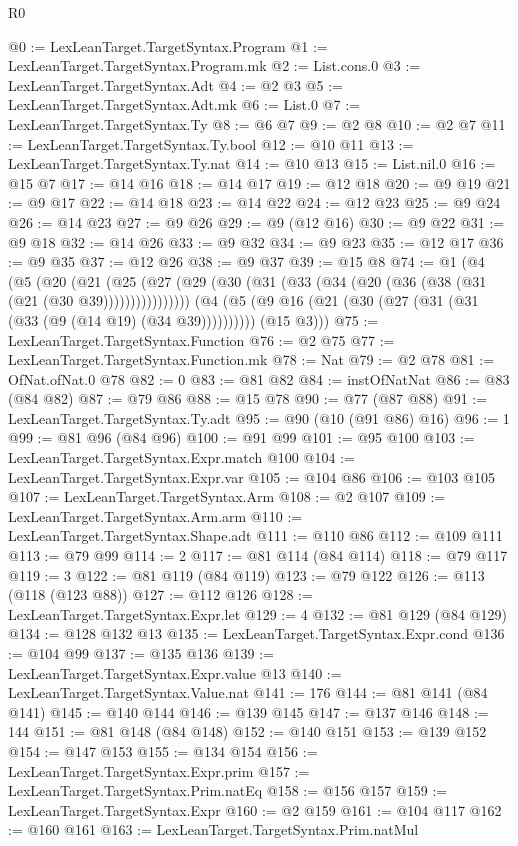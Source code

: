 \begin{lexlean}{R0}
\begin{coremodule}
@0 := LexLeanTarget.TargetSyntax.Program
@1 := LexLeanTarget.TargetSyntax.Program.mk
@2 := List.cons.{0}
@3 := LexLeanTarget.TargetSyntax.Adt
@4 := @2 @3
@5 := LexLeanTarget.TargetSyntax.Adt.mk
@6 := List.{0}
@7 := LexLeanTarget.TargetSyntax.Ty
@8 := @6 @7
@9 := @2 @8
@10 := @2 @7
@11 := LexLeanTarget.TargetSyntax.Ty.bool
@12 := @10 @11
@13 := LexLeanTarget.TargetSyntax.Ty.nat
@14 := @10 @13
@15 := List.nil.{0}
@16 := @15 @7
@17 := @14 @16
@18 := @14 @17
@19 := @12 @18
@20 := @9 @19
@21 := @9 @17
@22 := @14 @18
@23 := @14 @22
@24 := @12 @23
@25 := @9 @24
@26 := @14 @23
@27 := @9 @26
@29 := @9 (@12 @16)
@30 := @9 @22
@31 := @9 @18
@32 := @14 @26
@33 := @9 @32
@34 := @9 @23
@35 := @12 @17
@36 := @9 @35
@37 := @12 @26
@38 := @9 @37
@39 := @15 @8
@74 := @1
    (@4
      (@5
        (@20
          (@21 (@25 (@27 (@29 (@30 (@31 (@33 (@34 (@20 (@36 (@38 (@31 (@21 (@30 @39))))))))))))))))
      (@4 (@5 (@9 @16 (@21 (@30 (@27 (@31 (@31 (@33 (@9 (@14 @19) (@34 @39)))))))))) (@15 @3)))
@75 := LexLeanTarget.TargetSyntax.Function
@76 := @2 @75
@77 := LexLeanTarget.TargetSyntax.Function.mk
@78 := Nat
@79 := @2 @78
@81 := OfNat.ofNat.{0} @78
@82 := 0
@83 := @81 @82
@84 := instOfNatNat
@86 := @83 (@84 @82)
@87 := @79 @86
@88 := @15 @78
@90 := @77 (@87 @88)
@91 := LexLeanTarget.TargetSyntax.Ty.adt
@95 := @90 (@10 (@91 @86) @16)
@96 := 1
@99 := @81 @96 (@84 @96)
@100 := @91 @99
@101 := @95 @100
@103 := LexLeanTarget.TargetSyntax.Expr.match @100
@104 := LexLeanTarget.TargetSyntax.Expr.var
@105 := @104 @86
@106 := @103 @105
@107 := LexLeanTarget.TargetSyntax.Arm
@108 := @2 @107
@109 := LexLeanTarget.TargetSyntax.Arm.arm
@110 := LexLeanTarget.TargetSyntax.Shape.adt
@111 := @110 @86
@112 := @109 @111
@113 := @79 @99
@114 := 2
@117 := @81 @114 (@84 @114)
@118 := @79 @117
@119 := 3
@122 := @81 @119 (@84 @119)
@123 := @79 @122
@126 := @113 (@118 (@123 @88))
@127 := @112 @126
@128 := LexLeanTarget.TargetSyntax.Expr.let
@129 := 4
@132 := @81 @129 (@84 @129)
@134 := @128 @132 @13
@135 := LexLeanTarget.TargetSyntax.Expr.cond
@136 := @104 @99
@137 := @135 @136
@139 := LexLeanTarget.TargetSyntax.Expr.value @13
@140 := LexLeanTarget.TargetSyntax.Value.nat
@141 := 176
@144 := @81 @141 (@84 @141)
@145 := @140 @144
@146 := @139 @145
@147 := @137 @146
@148 := 144
@151 := @81 @148 (@84 @148)
@152 := @140 @151
@153 := @139 @152
@154 := @147 @153
@155 := @134 @154
@156 := LexLeanTarget.TargetSyntax.Expr.prim
@157 := LexLeanTarget.TargetSyntax.Prim.natEq
@158 := @156 @157
@159 := LexLeanTarget.TargetSyntax.Expr
@160 := @2 @159
@161 := @104 @117
@162 := @160 @161
@163 := LexLeanTarget.TargetSyntax.Prim.natMul

\end{coremodule}
\end{lexlean}

